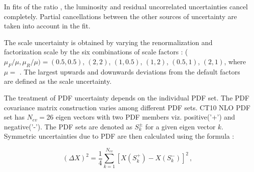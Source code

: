In fits of the ratio \ratio, the luminosity and residual uncorrelated
uncertainties cancel completely. Partial cancellations between the
other sources of uncertainty are taken into account in the fit.

The scale uncertainty is obtained by
varying the renormalization and factorization
scale by the six combinations of scale factors : ($\mu_F/\mu,\mu_R/\mu) = (0.5,0.5)$, $(2,2)$, $(1,0.5)$, $(1,2)$,
$(0.5,1)$, $(2,1)$, where $\mu=$ \httwo. The largest upwards and downwards deviations from the default factors are defined as the
scale uncertainty.

The treatment of PDF uncertainty depends on the individual PDF set. The PDF covariance matrix construction varies among different PDF sets. CT10 NLO PDF set has $N_{ev}=$26 eigen vectors with two PDF members viz. positive('+') and negative('-'). The PDF sets are denoted as $S_k^{\pm}$ for a given eigen vector $k$. Symmetric uncertainties due to PDF are then calculated using the formula \cite{CT10ERR}:

\begin{equation}
(\Delta X)^2 = \frac{1}{4} \sum_{k=1}^{N_{ev}} [X(S_k^{+}) - X(S_k^{-})]^2 \,,
\end{equation}

